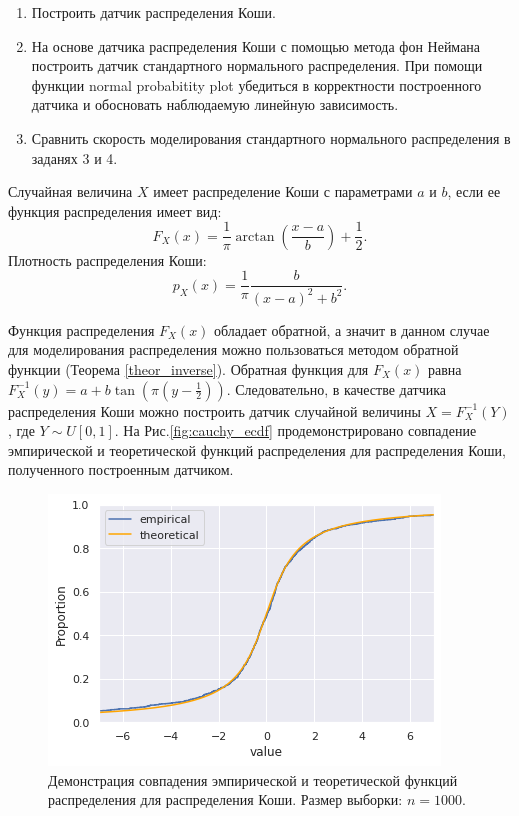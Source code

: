 \begin{enumerate}
\item Построить датчик распределения Коши. 
\item На основе датчика распределения Коши с помощью метода фон Неймана построить
 датчик стандартного нормального распределения. При помощи функции normal
 probabitity plot убедиться в корректности построенного датчика и обосновать
 наблюдаемую линейную зависимость.
\item Сравнить скорость моделирования стандартного нормального распределения в
 заданях 3 и 4.
\end{enumerate}

\begin{definition}
	Случайная величина $X$ имеет распределение Коши с параметрами $a$ и $b$, если
     ее функция распределения имеет вид:
    $$
	F_X(x) = \frac{1}{\pi}\arctan\left(\frac{x - a}{b}\right) + \frac{1}{2}.
	$$
	Плотность распределения Коши:
	$$
	p_X(x) = \frac{1}{\pi}\frac{b}{(x- a)^2 + b^2}.
	$$
\end{definition}

Функция распределения $F_X(x)$ обладает обратной, а значит в данном случае для
 моделирования распределения можно пользоваться методом обратной функции
 (Теорема \eqref{theor_inverse}). Обратная функция для $F_X(x)$ равна $F_X^{-1}(y)
 = a + b\tan\left(\pi\left(y - \frac{1}{2}\right)\right)$. Следовательно,
 в качестве датчика распределения Коши можно построить датчик случайной величины
 $X = F_X^{-1}(Y)$, где $Y \sim U[0, 1]$. На Рис.\eqref{fig:cauchy_ecdf}
 продемонстрировано совпадение эмпирической и теоретической функций распределения
 для распределения Коши, полученного построенным датчиком.

\begin{figure}[ht]
	\centering
	\includegraphics[width = 0.8\linewidth]{"./resources/cauchy_ecdf.png"}
	\caption{Демонстрация совпадения эмпирической и теоретической функций
     распределения для распределения Коши. Размер выборки: $ n = 1000 $.}
    \label{fig:cauchy_ecdf}
\end{figure}

